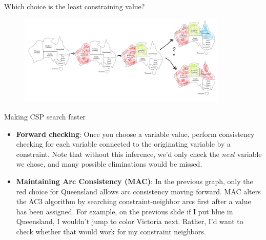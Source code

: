 \documentclass{beamer}
\begin{document}
\begin{frame}{Which choice is the least constraining value?}

    \begin{figure}
        \includegraphics[width=10cm]{images/least_constraing_value.png}
    \end{figure}
    
\end{frame}

\begin{frame}{Making CSP search faster}
    \begin{itemize}
        \item {\bf Forward checking}: Once you choose a variable value, perform consistency checking for each variable connected to the originating variable by a constraint.  Note that without this inference, we'd only check the {\em next} variable we chose, and many possible eliminations would be missed.
        \item {\bf Maintaining Arc Consistency (MAC)}: In the previous graph, only the red choice for Queensland allows arc consistency moving forward. MAC alters the AC3 algorithm by searching constraint-neighbor arcs first after a value has been assigned. For example, on the previous slide if I put blue in Queensland, I wouldn't jump to color Victoria next. Rather, I'd want to check whether that 
        would work for my constraint neighbors.
    \end{itemize}
\end{frame}
\end{document}
